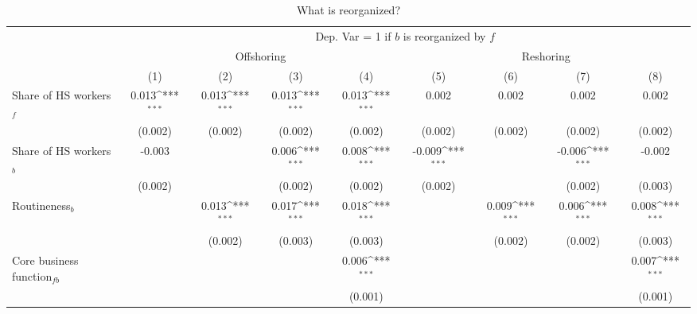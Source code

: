 \begin{table}[htbp] \footnotesize \centering
\def\sym#1{\ifmmode^{#1}\else\(^{#1}\)\fi}
\caption{What is reorganized? \label{tab:reg_what_paper}}
\renewcommand{\arraystretch}{1}
\begin{tabular}{l*{8}{c}}
\toprule
&\multicolumn{8}{c}{Dep. Var = 1 if $ b $ is reorganized by $ f $} \\
\cmidrule(lr){2-9}
                &\multicolumn{4}{c}{Offshoring}                                             &\multicolumn{4}{c}{Reshoring}                                              \\\cmidrule(lr){2-5}\cmidrule(lr){6-9}
                &\multicolumn{1}{c}{(1)}         &\multicolumn{1}{c}{(2)}         &\multicolumn{1}{c}{(3)}         &\multicolumn{1}{c}{(4)}         &\multicolumn{1}{c}{(5)}         &\multicolumn{1}{c}{(6)}         &\multicolumn{1}{c}{(7)}         &\multicolumn{1}{c}{(8)}         \\
\midrule
Share of HS workers$ _f$&    0.013\sym{***}&    0.013\sym{***}&    0.013\sym{***}&    0.013\sym{***}&    0.002         &    0.002         &    0.002         &    0.002         \\
                &  (0.002)         &  (0.002)         &  (0.002)         &  (0.002)         &  (0.002)         &  (0.002)         &  (0.002)         &  (0.002)         \\
\addlinespace
Share of HS workers$ _b$&   -0.003         &                  &    0.006\sym{***}&    0.008\sym{***}&   -0.009\sym{***}&                  &   -0.006\sym{***}&   -0.002         \\
                &  (0.002)         &                  &  (0.002)         &  (0.002)         &  (0.002)         &                  &  (0.002)         &  (0.003)         \\
\addlinespace
Routineness$ _b$&                  &    0.013\sym{***}&    0.017\sym{***}&    0.018\sym{***}&                  &    0.009\sym{***}&    0.006\sym{***}&    0.008\sym{***}\\
                &                  &  (0.002)         &  (0.003)         &  (0.003)         &                  &  (0.002)         &  (0.002)         &  (0.003)         \\
\addlinespace
Core business function$ _{fb}$&                  &                  &                  &    0.006\sym{***}&                  &                  &                  &    0.007\sym{***}\\
                &                  &                  &                  &  (0.001)         &                  &                  &                  &  (0.001)         \\

\end{tabular}
\end{table}

